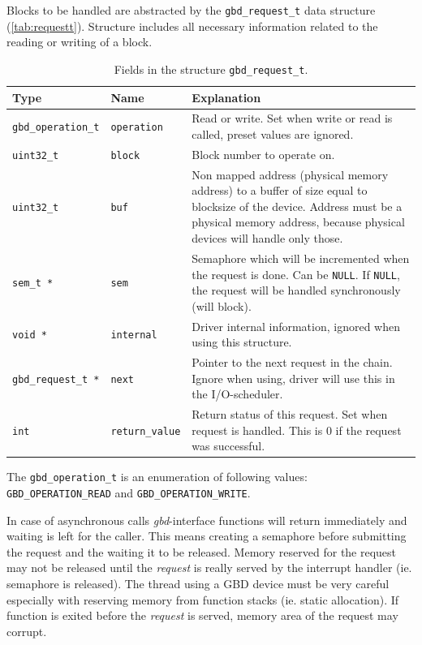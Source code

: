\documentclass[twoside,a4paper]{report}
\newcommand{\PBS}[1]{\let\temp=\\#1\let\\=\temp}
\newlength{\tablewidth}
\newenvironment{structdescription}{%
\begin{center}%
\begin{tabular}{p{3.5cm}|p{2.5cm}|>{\PBS\raggedright}p{\tablewidth-6\tabcolsep-6cm}}%
\textbf{Type} & \textbf{Name} & \textbf{Explanation} \\ %
}{%
\end{tabular}%
\end{center}%
}
\newcommand{\structfield}[3]{%
\hline%
\texttt{#1} & \texttt{#2} & #3 \\%
}
\begin{document}
Blocks to be handled are abstracted by the \texttt{gbd\_request\_t}
 data structure
(\autoref{tab:requestt}). Structure includes all necessary information
related to the reading or writing of a block.

\begin{table}
\begin{structdescription}

\structfield{\texttt{gbd\_operation\_t}}{operation}{Read or write. Set
when write or read is called, preset values are ignored.}

\structfield{\texttt{uint32\_t}}{\texttt{block}}{Block number to operate on.}

\structfield{\texttt{uint32\_t}}{\texttt{buf}}{Non mapped address
(physical memory address) to a buffer of size equal to blocksize of
the device. Address must be a physical memory address, because physical
devices will handle only those.}

\structfield{\texttt{sem\_t *}}{\texttt{sem}}{Semaphore which will be
incremented when the request is done. Can be \texttt{NULL}. If
\texttt{NULL}, the request will be handled synchronously (will
block).}

\structfield{\texttt{void *}}{\texttt{internal}}{Driver internal 
information, ignored when using this structure.}

\structfield{\texttt{gbd\_request\_t *}}{\texttt{next}}{Pointer to
the next request in the chain. Ignore when using, driver will use this in
the I/O-scheduler.}

\structfield{\texttt{int}}{\texttt{return\_value}}{Return status of
this request.  Set when request is handled. This is 0 if the request
was successful.}

\end{structdescription}
\caption{Fields in the structure \texttt{gbd\_request\_t}.}
\label{tab:requestt}
\end{table}

The \texttt{gbd\_operation\_t}
 is an enumeration
of following values: \texttt{GBD\_OPERATION\_READ}
 and
\texttt{GBD\_OPERATION\_WRITE}.

In case of asynchronous calls \emph{gbd}-interface functions will
return immediately and waiting is left for the caller. This means
creating a semaphore before submitting the request and the waiting it
to be released. Memory reserved for the request may not be released
until the \emph{request} is really served by the interrupt handler
(ie. semaphore is released). The thread using a GBD device must be
very careful especially with reserving memory from function stacks
(ie. static allocation). If function is exited before the
\emph{request} is served, memory area of the request may corrupt.
\end{document}
